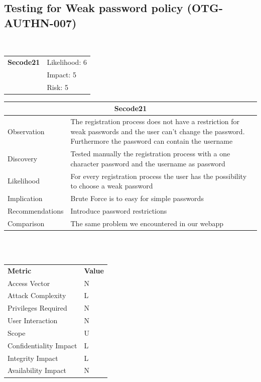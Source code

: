 \documentclass[headsepline,footsepline,footinclude=false,oneside,fontsize=11pt,paper=a4,listof=totoc,bibliography=totoc]{scrbook} %
\begin{document}
\pagebreak
\subsection{Testing for Weak password policy (OTG-AUTHN-007)}\

\begin{tabular}{cR{12cm}}
	\textbf{Secode21} & Likelihood: 6\\& Impact: 5\\& Risk: 5
\end{tabular}

\begin{tabular}{ l|p{11cm}  }
	\hline
	\multicolumn{2}{c}{\textbf{Secode21}} \\
	\hline
	Observation & The registration process does not have a restriction for weak passwords and the user can't
	change the password. Furthermore the password can contain the username\\
	Discovery & Tested manually the registration process with a one character password and the username as password\\
	Likelihood & For every registration process the user has the possibility to choose a weak password\\
	Implication & Brute Force is to easy for simple passwords\\
	Recommendations & Introduce password restrictions\\
	Comparison & The same problem we encountered in our webapp \\
	\hline
\end{tabular}
\\
\vspace{0.5cm}
\\
\begin{center}
	\begin{tabular}{ll}
		\rowcolor[HTML]{34CDF9}
		{\color[HTML]{ECF4FF} \textbf{Metric}}        & {\color[HTML]{ECF4FF} \textbf{Value}} \\
		\rowcolor[HTML]{BBDAFF}
		{\color[HTML]{333333} Access Vector}          & {\color[HTML]{333333} } N              \\
		\rowcolor[HTML]{ECF4FF}
		{\color[HTML]{333333} Attack Complexity}      & {\color[HTML]{333333} } L              \\
		\rowcolor[HTML]{BBDAFF}
		{\color[HTML]{333333} Privileges Required}    & {\color[HTML]{333333} } N              \\
		\rowcolor[HTML]{ECF4FF}
		{\color[HTML]{333333} User Interaction}       & {\color[HTML]{333333} } N              \\
		\rowcolor[HTML]{BBDAFF}
		{\color[HTML]{333333} Scope}                  & {\color[HTML]{333333} } U              \\
		\rowcolor[HTML]{ECF4FF}
		{\color[HTML]{333333} Confidentiality Impact} & {\color[HTML]{333333} } L              \\
		\rowcolor[HTML]{BBDAFF}
		{\color[HTML]{333333} Integrity Impact}       & {\color[HTML]{333333} } L              \\
		\rowcolor[HTML]{ECF4FF}
		{\color[HTML]{333333} Availability Impact}    & {\color[HTML]{333333} } N
	\end{tabular}
\end{center}
\end{document}
